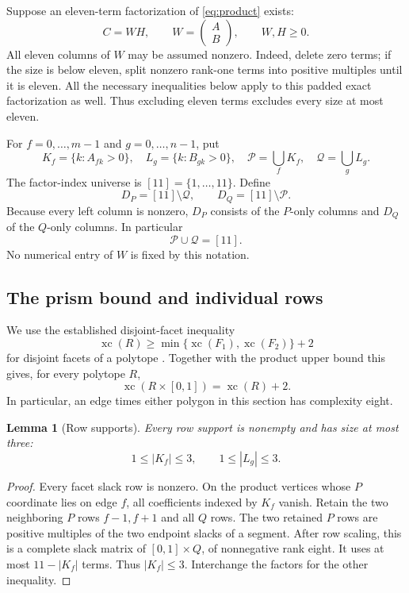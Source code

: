 \documentclass[11pt,a4paper]{article}
\newcommand{\xc}{\operatorname{xc}}
\newtheorem{lemma}[theorem]{Lemma}
\theoremstyle{definition}\newtheorem{definition}[theorem]{Definition}
\theoremstyle{remark}\newtheorem{remark}[theorem]{Remark}
\begin{document}
Suppose an eleven-term factorization of \eqref{eq:product} exists:
\[
 C=WH,\qquad W=\begin{pmatrix}A\\B\end{pmatrix},\qquad W,H\ge0.
\]
All eleven columns of $W$ may be assumed nonzero. Indeed, delete zero terms;
if the size is below eleven, split nonzero rank-one terms into positive
multiples until it is eleven. All the necessary inequalities below apply to
this padded exact factorization as well. Thus excluding eleven terms excludes
every size at most eleven.

For $f=0,\ldots,m-1$ and $g=0,\ldots,n-1$, put
\[
 K_f=\{k:A_{fk}>0\},\quad L_g=\{k:B_{gk}>0\},\quad
 \mathcal P=\bigcup_fK_f,\quad\mathcal Q=\bigcup_gL_g.
\]
The factor-index universe is $[11]=\{1,\ldots,11\}$. Define
\[
 D_P=[11]\setminus\mathcal Q,\qquad
 D_Q=[11]\setminus\mathcal P.
\]
Because every left column is nonzero, $D_P$ consists of the $P$-only columns
and $D_Q$ of the $Q$-only columns. In particular
\begin{equation}\label{eq:used}
 \mathcal P\cup\mathcal Q=[11].
\end{equation}
No numerical entry of $W$ is fixed by this notation.

\subsection{The prism bound and individual rows}
We use the established disjoint-facet inequality
\[
 \xc(R)\ge\min\{\xc(F_1),\xc(F_2)\}+2
\]
for disjoint facets of a polytope \cite{gps}. Together with the product upper
bound this gives, for every polytope $R$,
\begin{equation}\label{eq:prism}
 \xc(R\times[0,1])=\xc(R)+2.
\end{equation}
In particular, an edge times either polygon in this section has complexity
eight.

\begin{lemma}[Row supports]\label{lem:row}
Every row support is nonempty and has size at most three:
\begin{equation}\label{eq:row}
 1\le |K_f|\le3,\qquad 1\le|L_g|\le3.
\end{equation}
\end{lemma}
\begin{proof}
Every facet slack row is nonzero. On the product vertices whose $P$ coordinate
lies on edge $f$, all coefficients indexed by $K_f$ vanish. Retain the two
neighboring $P$ rows $f-1,f+1$ and all $Q$ rows. The two retained $P$ rows are
positive multiples of the two endpoint slacks of a segment. After row scaling,
this is a complete slack matrix of $[0,1]\times Q$, of nonnegative rank eight.
It uses at most $11-|K_f|$ terms. Thus $|K_f|\le3$. Interchange the factors
for the other inequality.
\end{proof}
\end{document}
